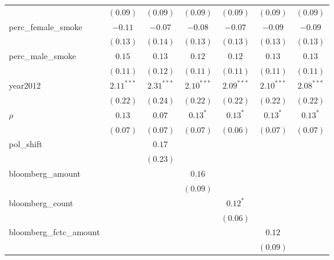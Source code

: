 \begin{table}[!h]
\begin{center}
\begin{tabular}{l c c c c c c }
                        & $(0.09)$     & $(0.09)$     & $(0.09)$     & $(0.09)$     & $(0.09)$     & $(0.09)$     \\
perc\_female\_smoke     & $-0.11$      & $-0.07$      & $-0.08$      & $-0.07$      & $-0.09$      & $-0.09$      \\
                        & $(0.13)$     & $(0.14)$     & $(0.13)$     & $(0.13)$     & $(0.13)$     & $(0.13)$     \\
perc\_male\_smoke       & $0.15$       & $0.13$       & $0.12$       & $0.12$       & $0.13$       & $0.13$       \\
                        & $(0.11)$     & $(0.12)$     & $(0.11)$     & $(0.11)$     & $(0.11)$     & $(0.11)$     \\
year2012                & $2.11^{***}$ & $2.31^{***}$ & $2.10^{***}$ & $2.09^{***}$ & $2.10^{***}$ & $2.08^{***}$ \\
                        & $(0.22)$     & $(0.24)$     & $(0.22)$     & $(0.22)$     & $(0.22)$     & $(0.22)$     \\
$\rho$                  & $0.13$       & $0.07$       & $0.13^{*}$   & $0.13^{*}$   & $0.13^{*}$   & $0.13^{*}$   \\
                        & $(0.07)$     & $(0.07)$     & $(0.07)$     & $(0.06)$     & $(0.07)$     & $(0.07)$     \\
pol\_shift              &              & $0.17$       &              &              &              &              \\
                        &              & $(0.23)$     &              &              &              &              \\
bloomberg\_amount       &              &              & $0.16$       &              &              &              \\
                        &              &              & $(0.09)$     &              &              &              \\
bloomberg\_count        &              &              &              & $0.12^{*}$   &              &              \\
                        &              &              &              & $(0.06)$     &              &              \\
bloomberg\_fctc\_amount &              &              &              &              & $0.12$       &              \\
                        &              &              &              &              & $(0.09)$     &              \\

\end{tabular}
\end{center}
\end{table}
